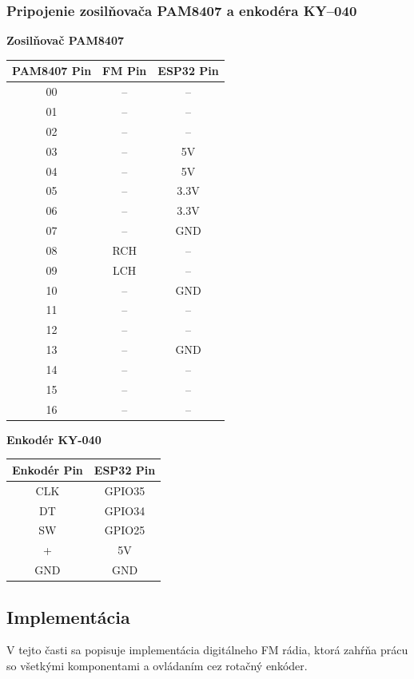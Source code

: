\documentclass[11pt, a4paper]{article}
\begin{document}
\subsubsection{Pripojenie zosilňovača PAM8407 a enkodéra KY--040}
\begin{minipage}[t]{0.48\textwidth}
\centering
\textbf{Zosilňovač PAM8407}
\begin{tabular}{|c|c|c|}
\hline
\textbf{PAM8407 Pin} & \textbf{FM Pin} & \textbf{ESP32 Pin}\\
\hline
00 & -- & -- \\
01 & -- & -- \\
02 & -- & -- \\
03 & -- & 5V \\
04 & -- & 5V \\
05 & -- & 3.3V \\
06 & -- & 3.3V \\
07 & -- & GND \\
08 & RCH & -- \\
09 & LCH & -- \\
10 & -- & GND \\
11 & -- & -- \\
12 & -- & -- \\
13 & -- & GND \\
14 & -- & -- \\
15 & -- & -- \\
16 & -- & -- \\
\hline
\end{tabular}
\end{minipage}
\hfill
\begin{minipage}[t]{0.48\textwidth}
\centering
\textbf{Enkodér KY-040}\\
\begin{tabular}{|c|c|}
\hline
\textbf{Enkodér Pin} & \textbf{ESP32 Pin} \\
\hline
CLK & GPIO35 \\
DT  & GPIO34 \\
SW  & GPIO25 \\
+   & 5V \\
GND & GND \\
\hline
\end{tabular}
\end{minipage}

\subsection{Implementácia}
V tejto časti sa popisuje implementácia digitálneho FM rádia, ktorá zahŕňa prácu so 
všetkými komponentami a ovládaním cez rotačný enkóder.
\end{document}
